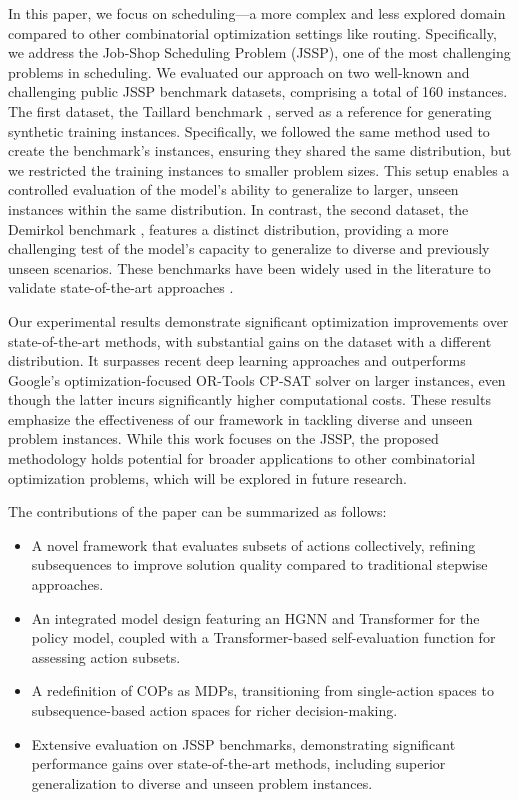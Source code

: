In this paper, we focus on scheduling—a more complex and less explored domain compared to other combinatorial optimization settings like routing. Specifically, we address the Job-Shop Scheduling Problem (JSSP), one of the most challenging problems in scheduling. We evaluated our approach on two well-known and challenging public JSSP benchmark datasets, comprising a total of 160 instances. The first dataset, the Taillard benchmark \cite{taillard1993benchmarks}, served as a reference for generating synthetic training instances. Specifically, we followed the same method used to create the benchmark's instances, ensuring they shared the same distribution, but we restricted the training instances to smaller problem sizes. This setup enables a controlled evaluation of the model’s ability to generalize to larger, unseen instances within the same distribution. In contrast, the second dataset, the Demirkol benchmark \cite{demirkol1998benchmarks}, features a distinct distribution, providing a more challenging test of the model's capacity to generalize to diverse and previously unseen scenarios. These benchmarks have been widely used in the literature to validate state-of-the-art approaches \cite{pirnay2024self, corsini2024self}.

Our experimental results demonstrate significant optimization improvements over state-of-the-art methods, with substantial gains on the dataset with a different distribution. It surpasses recent deep learning approaches and outperforms Google's optimization-focused OR-Tools CP-SAT solver on larger instances, even though the latter incurs significantly higher computational costs. These results emphasize the effectiveness of our framework in tackling diverse and unseen problem instances. While this work focuses on the JSSP, the proposed methodology holds potential for broader applications to other combinatorial optimization problems, which will be explored in future research.

The contributions of the paper can be summarized as follows:

\begin{itemize}
    \item A novel framework that evaluates subsets of actions collectively, refining subsequences to improve solution quality compared to traditional stepwise approaches.
    \item An integrated model design featuring an HGNN and Transformer for the policy model, coupled with a Transformer-based self-evaluation function for assessing action subsets.
    \item A redefinition of COPs as MDPs, transitioning from single-action spaces to subsequence-based action spaces for richer decision-making.
    \item Extensive evaluation on JSSP benchmarks, demonstrating significant performance gains over state-of-the-art methods, including superior generalization to diverse and unseen problem instances.
\end{itemize}










